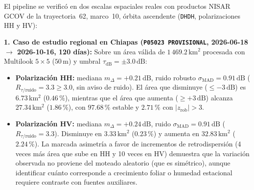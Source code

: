\documentclass[11pt,a4paper]{article}
\newcommand{\unit}[1]{\mathrm{#1}}
\begin{document}
\begin{ejemplo}
El pipeline se verificó en dos escalas espaciales reales con productos NISAR GCOV de la trayectoria~62,
marco~10, órbita ascendente (\texttt{DHDH}, polarizaciones HH y HV):

\medskip
\noindent\textbf{1. Caso de estudio regional en Chiapas (\texttt{P05023 PROVISIONAL}, 2026-06-18 $\to$ 2026-10-16, 120 días):}
Sobre un área válida de $1\,469.2\,\unit{km^2}$ procesada con Multilook $5\times 5$ ($50\,\unit{m}$) y umbral
$\tau_{\mathrm{dB}} = \pm 3.0\,\unit{dB}$:
\begin{itemize}
  \item \textbf{Polarización HH:} mediana $m_{\Delta} = +0.21\,\unit{dB}$, ruido robusto $\sigma_{\mathrm{MAD}} = 0.91\,\unit{dB}$
        ($R_{\tau/\text{ruido}} = 3.3 \ge 3.0$, sin aviso de ruido). El área que disminuye ($\le -3\,\unit{dB}$) es
        $6.73\,\unit{km^2}$ ($0.46\,\text{\%}$), mientras que el área que aumenta ($\ge +3\,\unit{dB}$) alcanza
        $27.34\,\unit{km^2}$ ($1.86\,\text{\%}$), con $97.68\,\text{\%}$ estable y $2.71\,\text{\%}$ con $|z_{\mathrm{rob}}| > 3$.
  \item \textbf{Polarización HV:} mediana $m_{\Delta} = +0.24\,\unit{dB}$, ruido $\sigma_{\mathrm{MAD}} = 0.91\,\unit{dB}$
        ($R_{\tau/\text{ruido}} = 3.3$). Disminuye en $3.33\,\unit{km^2}$ ($0.23\,\text{\%}$) y aumenta en
        $32.83\,\unit{km^2}$ ($2.24\,\text{\%}$). La marcada asimetría a favor de incrementos de retrodispersión
        (4 veces más área que sube en HH y 10 veces en HV) demuestra que la variación observada no proviene del
        moteado aleatorio (que es simétrico), aunque identificar cuánto corresponde a crecimiento foliar o humedad
        estacional requiere contraste con fuentes auxiliares.
\end{itemize}


\end{ejemplo}
\end{document}
